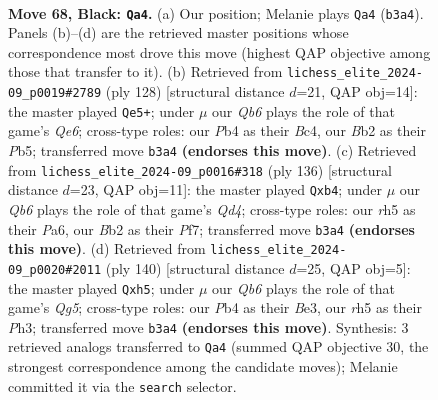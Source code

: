 \documentclass[11pt]{article}
\begin{document}
\clearpage

\begin{figure}[p]\centering
\begin{subfigure}{0.46\textwidth}\centering
\resizebox{\linewidth}{!}{%
\newchessgame
\chessboard[
  setfen={8/8/8/7R/1p1k4/1q3B2/1b3K2/8 b - - 27 68},
  showmover=false,
  pgfstyle=straightmove, color=movearrow, markmove={b3-a4}
]}
\caption{}
\end{subfigure}\hfill
\begin{subfigure}{0.46\textwidth}\centering
\resizebox{\linewidth}{!}{%
\newchessgame
\chessboard[
  setfen={7R/8/4Q1b1/1P4k1/2B5/2K5/8/8 w - - 3 65},
  showmover=false,
  pgfstyle=straightmove, color=movearrow, markmove={e6-e5}
]}
\caption{}
\end{subfigure}
\\[4pt]
\begin{subfigure}{0.46\textwidth}\centering
\resizebox{\linewidth}{!}{%
\newchessgame
\chessboard[
  setfen={8/5P2/P7/3K2k1/1b1Q4/8/8/8 w - - 3 69},
  showmover=false,
  pgfstyle=straightmove, color=movearrow, markmove={d4-b4}
]}
\caption{}
\end{subfigure}\hfill
\begin{subfigure}{0.46\textwidth}\centering
\resizebox{\linewidth}{!}{%
\newchessgame
\chessboard[
  setfen={8/8/8/6Qp/4k3/4B2P/6K1/8 w - - 11 71},
  showmover=false,
  pgfstyle=straightmove, color=movearrow, markmove={g5-h5}
]}
\caption{}
\end{subfigure}
\caption{\textbf{Move 68, Black: \texttt{Qa4}.} (a) Our position; Melanie plays \texttt{Qa4} (\texttt{b3a4}). Panels (b)--(d) are the retrieved master positions whose correspondence most drove this move (highest QAP objective among those that transfer to it). (b) Retrieved from \texttt{lichess\_elite\_2024-09\_p0019\#2789} (ply 128) [structural distance $d$=21, QAP obj=14]: the master played \texttt{Qe5+}; under $\mu$ our \emph{Qb6} plays the role of that game's \emph{Qe6}; cross-type roles: our \emph{P}b4 as their \emph{B}c4, our \emph{B}b2 as their \emph{P}b5; transferred move \texttt{b3a4} \textbf{(endorses this move)}. (c) Retrieved from \texttt{lichess\_elite\_2024-09\_p0016\#318} (ply 136) [structural distance $d$=23, QAP obj=11]: the master played \texttt{Qxb4}; under $\mu$ our \emph{Qb6} plays the role of that game's \emph{Qd4}; cross-type roles: our \emph{r}h5 as their \emph{P}a6, our \emph{B}b2 as their \emph{P}f7; transferred move \texttt{b3a4} \textbf{(endorses this move)}. (d) Retrieved from \texttt{lichess\_elite\_2024-09\_p0020\#2011} (ply 140) [structural distance $d$=25, QAP obj=5]: the master played \texttt{Qxh5}; under $\mu$ our \emph{Qb6} plays the role of that game's \emph{Qg5}; cross-type roles: our \emph{P}b4 as their \emph{B}e3, our \emph{r}h5 as their \emph{P}h3; transferred move \texttt{b3a4} \textbf{(endorses this move)}. Synthesis: 3 retrieved analogs transferred to \texttt{Qa4} (summed QAP objective 30, the strongest correspondence among the candidate moves); Melanie committed it via the \texttt{search} selector.}
\label{fig:thought-m135}
\end{figure}
\end{document}
